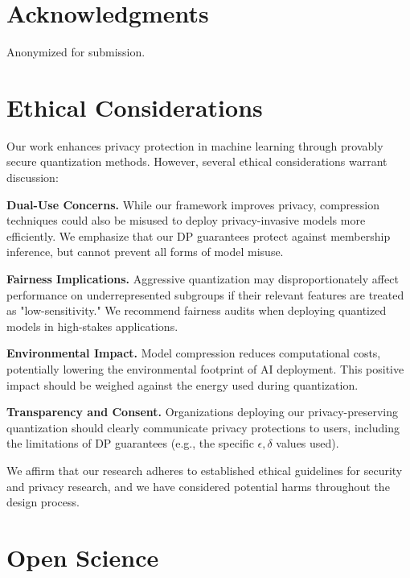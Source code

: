 \documentclass[letterpaper,twocolumn,10pt]{article}
\begin{document}
\section*{Acknowledgments}

Anonymized for submission.

\cleardoublepage
\appendix

\section*{Ethical Considerations}
\label{sec:ethics}

Our work enhances privacy protection in machine learning through provably secure quantization methods. However, several ethical considerations warrant discussion:

\textbf{Dual-Use Concerns.} While our framework improves privacy, compression techniques could also be misused to deploy privacy-invasive models more efficiently. We emphasize that our DP guarantees protect against membership inference, but cannot prevent all forms of model misuse.

\textbf{Fairness Implications.} Aggressive quantization may disproportionately affect performance on underrepresented subgroups if their relevant features are treated as "low-sensitivity." We recommend fairness audits when deploying quantized models in high-stakes applications.

\textbf{Environmental Impact.} Model compression reduces computational costs, potentially lowering the environmental footprint of AI deployment. This positive impact should be weighed against the energy used during quantization.

\textbf{Transparency and Consent.} Organizations deploying our privacy-preserving quantization should clearly communicate privacy protections to users, including the limitations of DP guarantees (e.g., the specific $\epsilon, \delta$ values used).

We affirm that our research adheres to established ethical guidelines for security and privacy research, and we have considered potential harms throughout the design process.

\cleardoublepage

\section*{Open Science}
\label{sec:open_science}
\end{document}
